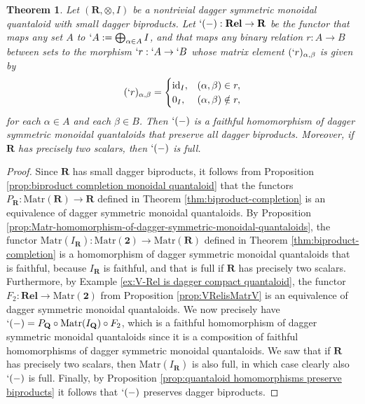 \documentclass[12pt]{tac}
\newtheorem{theorem}{Theorem}[section]
\theoremstyle{definition}
\theoremstyle{remark}
\newcommand{\<}{\langle}
\renewcommand{\>}{\rangle}
\renewcommand{\:}{\colon}
\newcommand{\id}{\mathrm{id}}
\begin{document}
\begin{theorem}\label{thm:qRel quote}
    Let $(\mathbf R,\otimes,I)$ be a nontrivial dagger symmetric monoidal quantaloid with small dagger biproducts. Let $`(-):\mathbf{Rel}\to\mathbf{R}$ be the functor that maps any set $A$ to  $`A:=\bigoplus_{\alpha\in A}I$, and that maps any binary relation $r:A\to B$ between sets to the morphism $`r:`A\to `B$ whose matrix element $(`r)_{\alpha,\beta}$ is given by 
     \[(`r)_{\alpha,\beta}=\begin{cases}
    \id_I, & (\alpha,\beta)\in r,\\
    0_I, & (\alpha,\beta)\notin r,
    \end{cases}\] for each $\alpha\in A$ and each $\beta\in B$. Then $`(-)$ is a faithful homomorphism of dagger symmetric monoidal quantaloids that preserve all dagger biproducts. Moreover, if $\mathbf R$ has precisely two scalars, then $`(-)$ is full. 
    \end{theorem}
\begin{proof}
Since $\mathbf R$ has small dagger biproducts, it follows from Proposition \ref{prop:biproduct completion monoidal quantaloid} that the functors $P_\mathbf R:\mathrm{Matr}(\mathbf R)\to\mathbf R$ defined in Theorem \ref{thm:biproduct-completion} is an equivalence of dagger symmetric monoidal quantaloids.
By Proposition \ref{prop:Matr-homomorphism-of-dagger-symmetric-monoidal-quantaloids}, the functor $\mathrm{Matr}(I_\mathbf R):\mathrm{Matr}(\mathbf 2)\to\mathrm{Matr}(\mathbf R)$ defined in Theorem \ref{thm:biproduct-completion} is a homomorphism of dagger symmetric monoidal quantaloids that is faithful, because $I_\mathbf R$ is faithful, and that is full if $\mathbf R$ has precisely two scalars. Furthermore, by Example \ref{ex:V-Rel is dagger compact quantaloid}, the functor $F_2:\mathbf{Rel}\to \mathrm{Matr}(\mathbf 2)$ from Proposition \ref{prop:VRelisMatrV} is an equivalence of dagger symmetric monoidal quantaloids. We now precisely have  $`(-)=P_\mathbf Q\circ\mathrm{Matr}(I_\mathbf Q)\circ F_2$, which is a faithful homomorphism of dagger symmetric monoidal quantaloids since it is a composition of faithful homomorphisms of dagger symmetric monoidal quantaloids. We saw that if $\mathbf R$ has precisely two scalars, then $\mathrm{Matr}(I_\mathbf R)$ is also full, in which case clearly also $`(-)$ is full. Finally, by Proposition \ref{prop:quantaloid homomorphisms preserve biproducts} it follows that $`(-)$ preserves dagger biproducts.
\end{proof}
\end{document}
